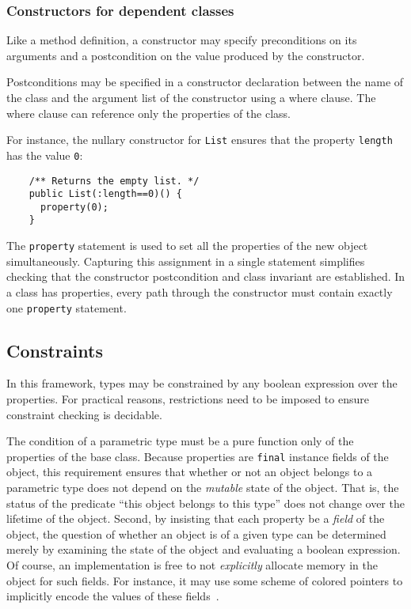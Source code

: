 \documentclass[nocopyrightspace,preprint,9pt]{sigplanconf}
\begin{document}
\subsubsection{Constructors for dependent classes}

Like a method definition,
a constructor may
specify preconditions on its arguments
and a postcondition on the value produced by the constructor.

Postconditions may be specified in a constructor declaration between
the name of the class and the argument list of the constructor using a
where clause. The where clause can reference only the properties of
the class.

For instance, the
nullary constructor for {\tt List} ensures that the property
{\tt length} has the value {\tt 0}:
{\footnotesize
\begin{verbatim}
    /** Returns the empty list. */
    public List(:length==0)() {
      property(0);
    }
\end{verbatim}}
The {\tt property} statement is used to set all the properties
of the new object simultaneously.  Capturing this assignment in
a single statement simplifies checking that the constructor
postcondition and class invariant are established.  In a class
has properties, every path through the constructor must contain
exactly one {\tt property} statement.



\subsection{Constraints}

In this framework, types may be constrained by any boolean
expression over the properties.  For practical reasons,
restrictions need to be imposed to ensure constraint checking is
decidable.

The condition of a parametric type must be a pure
function only of the properties of the base class.
Because properties are
{\tt final} instance fields of the object,
this requirement
ensures that whether or not an object belongs to a parametric type does
not depend on the {\em mutable} state of the object.
That is, the status of the
predicate ``this object belongs to this type'' does not
change over the lifetime of the object.  Second, by insisting that each
property be a {\em field} of the object, the question of
whether an object is of a given type can be
determined merely by examining the state of the object and evaluating
a boolean expression. Of course, an implementation is free to not {\em
explicitly} allocate memory in the object for such fields. For
instance, it may use some scheme of colored pointers to implicitly
encode the values of these fields~\cite{???}.
\end{document}

